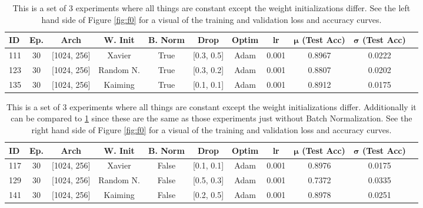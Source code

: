 \documentclass[10pt]{amsart}
\begin{document}
\begin{table}[h]
    \centering
    \begin{tabular}{|l|c|c|c|c|c|c|c|c|c|c|} %
        \hline
        \textbf{ID} & \textbf{Ep.}
        & \textbf{Arch} & \textbf{W. Init}
        & \textbf{B. Norm} & \textbf{Drop}
        & \textbf{Optim} & \textbf{lr}
	& \textbf{$\bm \mu$ (Test Acc)}
        & \textbf{$\bm \sigma$ (Test Acc)} \\ 
        \hline
        111 & 30 & [1024, 256]  & Xavier 		& True & [0.3, 0.5] & Adam & 0.001 & 0.8967 & 0.0222 \\
        \hline
        123 & 30 & [1024, 256]  & Random N. 	& True & [0.3, 0.2] & Adam & 0.001 & 0.8807 & 0.0202 \\
        \hline
        135 & 30 & [1024, 256]  & Kaiming 		& True & [0.1, 0.1] & Adam & 0.001 & 0.8912 & 0.0175 \\  
        \hline
    \end{tabular}
    \caption{This is a set of 3 experiments where all things are constant except the weight initializations differ.
    See the left hand side of Figure \ref{fig:f0} for a visual of the training and validation loss and accuracy curves.}
    \label{tab:tab0}
\vspace*{-1mm}
\end{table}

\begin{table}[h]
\vspace*{-1mm}
    \centering
    \begin{tabular}{|l|c|c|c|c|c|c|c|c|c|c|} %
        \hline
        \textbf{ID} & \textbf{Ep.}
        & \textbf{Arch} & \textbf{W. Init}
        & \textbf{B. Norm} & \textbf{Drop}
        & \textbf{Optim} & \textbf{lr}
	& \textbf{$\bm \mu$ (Test Acc)}
        & \textbf{$\bm \sigma$ (Test Acc)} \\ 
        \hline
        117 & 30 & [1024, 256]  & Xavier 		& False & [0.1, 0.1] & Adam & 0.001 & 0.8976 & 0.0175 \\
        \hline
        129 & 30 & [1024, 256]  & Random N. 	& False & [0.5, 0.3] & Adam & 0.001 & 0.7372 & 0.0335 \\
        \hline
        141 & 30 & [1024, 256]  & Kaiming 		& False & [0.2, 0.5] & Adam & 0.001 & 0.8978 & 0.0251 \\  
        \hline
    \end{tabular}
    \caption{This is a set of 3 experiments where all things are constant except the weight initializations differ.
    Additionally it can be compared to \ref{tab:tab0} since these are the same as those experiments just without Batch Normalization.
    See the right hand side of Figure \ref{fig:f0} for a visual of the training and validation loss and accuracy curves.}
    \label{tab:tab1}
\end{table}
\end{document}
